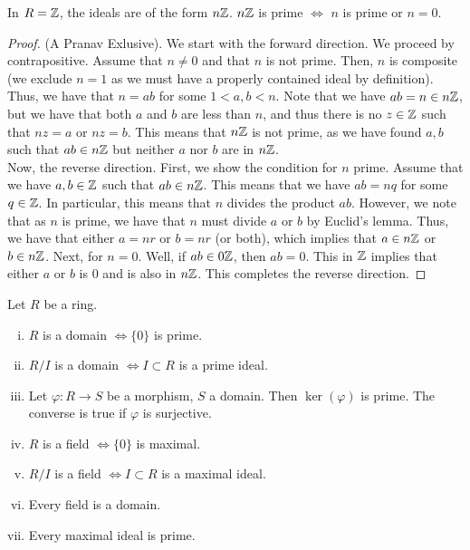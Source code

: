 \begin{ex}
    In $R = \mathbb{Z}$, the ideals are of the form $n\mathbb{Z}$. $n\mathbb{Z}$ is prime $\iff$ $n$ is prime or $n = 0$.
\end{ex}
\begin{proof}
    (A Pranav Exlusive). We start with the forward direction. We proceed by contrapositive.
    Assume that $n \neq 0$ and that $n$ is not prime. Then, $n$ is composite (we exclude $n = 1$ as
    we must have a properly contained ideal by definition). Thus, we have that $n = ab$ for some $1 < a,b < n$.
    Note that we have $ab = n \in n\mathbb{Z}$, but we have that both $a$ and $b$ are less than $n$, and thus there is no $z \in \mathbb{Z}$
    such that $nz = a$ or $nz = b$. This means that $n\mathbb{Z}$ is not prime, as we have found $a,b$ such that
    $ab \in n\mathbb{Z}$ but neither $a$ nor $b$ are in $n\mathbb{Z}$. \\
    Now, the reverse direction. First, we show the condition for $n$ prime. Assume that we have $a,b \in \mathbb{Z}$ such that $ab \in n\mathbb{Z}$.
    This means that we have $ab = nq$ for some $q \in \mathbb{Z}$. In particular, this means that $n$ divides
    the product $ab$. However, we note that as $n$ is prime, we have that $n$ must divide $a$
    or $b$ by Euclid's lemma. Thus, we have that either $a = nr$ or $b = nr$ (or both), which implies
    that $a \in n\mathbb{Z}$ or $b \in n\mathbb{Z}$. Next, for $n = 0$. Well, if $ab \in 0\mathbb{Z}$, then $ab = 0$. This in $\mathbb{Z}$ implies
    that either $a$ or $b$  is $0$ and is also in $n\mathbb{Z}$. This completes the reverse direction.
\end{proof}
\begin{thm}\label{Thm 8, Jan 6}
    Let $R$ be a ring.
    \begin{enumerate}[i)]
        \item $R$ is a domain $\iff \{0\}$ is prime.
        \item $R / I$ is a domain $\iff I \subset R$ is a prime ideal.
        \item Let $\varphi: R \rightarrow S$ be a morphism, $S$ a domain. Then
        $\ker(\varphi)$ is prime. The converse is true if $\varphi$ is surjective.
        \item $R$ is a field $\iff \{0\}$ is maximal.
        \item $R / I$ is a field $\iff I \subset R$ is a maximal ideal.
        \item Every field is a domain.
        \item Every maximal ideal is prime.
    \end{enumerate}
\end{thm}
